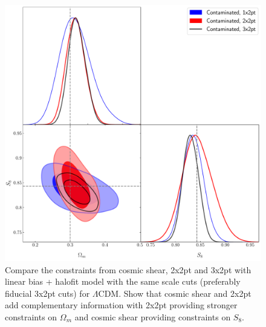 \documentclass[fleqn,usenatbib]{mnras}
\begin{document}
\begin{figure}
\includegraphics[width=\columnwidth]{figs/compare_all_cosmo_3x2pt_lcdm_contaminated.pdf}
\caption[]{Compare the constraints from cosmic shear,  2x2pt and 3x2pt  with linear bias + halofit model with the same scale cuts (preferably fiducial 3x2pt cuts) for $\Lambda$CDM. Show that cosmic shear and 2x2pt add complementary information with 2x2pt providing stronger constraints on $\Omega_m$ and cosmic shear providing constraints on $S_8$.}
\label{fig:des_comp}
\end{figure}
\end{document}
